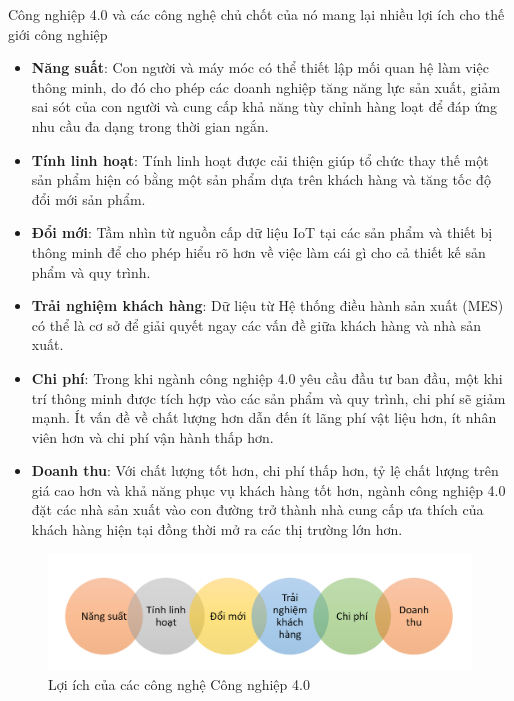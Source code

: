Công nghiệp 4.0 và các công nghệ chủ chốt của nó mang lại nhiều lợi ích cho thế giới công nghiệp
\begin{itemize}
    \item \textbf{Năng suất}: Con người và máy móc có thể thiết lập mối quan hệ làm việc thông minh, do đó cho phép các doanh nghiệp tăng năng lực sản xuất, giảm sai sót của con người và cung cấp khả năng tùy chỉnh hàng loạt để đáp ứng nhu cầu đa dạng trong thời gian ngắn.
    \item \textbf{Tính linh hoạt}: Tính linh hoạt được cải thiện giúp tổ chức thay thế một sản phẩm hiện có bằng một sản phẩm dựa trên khách hàng và tăng tốc độ đổi mới sản phẩm.
    \item \textbf{Đổi mới}: Tầm nhìn từ nguồn cấp dữ liệu IoT tại các sản phẩm và thiết bị thông minh để cho phép hiểu rõ hơn về việc làm cái gì cho cả thiết kế sản phẩm và quy trình.
    \item \textbf{Trải nghiệm khách hàng}: Dữ liệu từ Hệ thống điều hành sản xuất (MES) có thể là cơ sở để giải quyết ngay các vấn đề giữa khách hàng và nhà sản xuất.
    \item \textbf{Chi phí}: Trong khi ngành công nghiệp 4.0 yêu cầu đầu tư ban đầu, một khi trí thông minh được tích hợp vào các sản phẩm và quy trình, chi phí sẽ giảm mạnh. Ít vấn đề về chất lượng hơn dẫn đến ít lãng phí vật liệu hơn, ít nhân viên hơn và chi phí vận hành thấp hơn. 
    \item \textbf{Doanh thu}: Với chất lượng tốt hơn, chi phí thấp hơn, tỷ lệ chất lượng trên giá cao hơn và khả năng phục vụ khách hàng tốt hơn, ngành công nghiệp 4.0 đặt các nhà sản xuất vào con đường trở thành nhà cung cấp ưa thích của khách hàng hiện tại đồng thời mở ra các thị trường lớn hơn.
\end{itemize}

\begin{figure}[!h]
    \centering
    \includegraphics[width=\textwidth]{Images/Intro/advantage.jpg}
    \caption{Lợi ích của các công nghệ Công nghiệp 4.0}
    \label{fig:advantage}
\end{figure}

